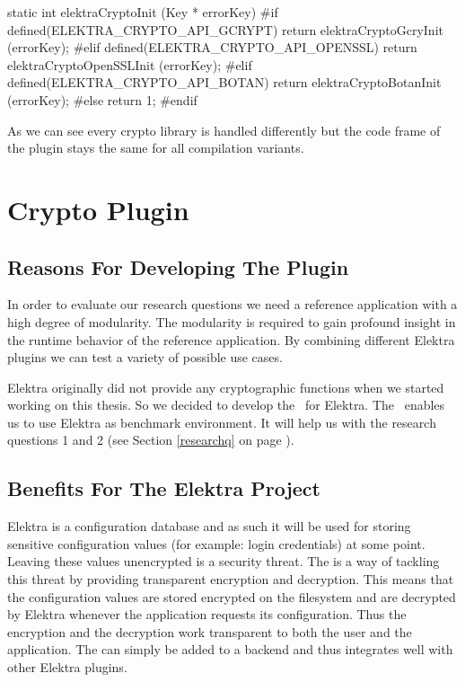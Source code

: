 \begin{code}[label=impl-cryptoInit,language=C,caption={Example of how to use compilation variants in Elektra}]
static int elektraCryptoInit (Key * errorKey)
{
#if defined(ELEKTRA_CRYPTO_API_GCRYPT)
	return elektraCryptoGcryInit (errorKey);
#elif defined(ELEKTRA_CRYPTO_API_OPENSSL)
	return elektraCryptoOpenSSLInit (errorKey);
#elif defined(ELEKTRA_CRYPTO_API_BOTAN)
	return elektraCryptoBotanInit (errorKey);
#else
	return 1;
#endif
}
\end{code}

As we can see every crypto library is handled differently but the code frame of the plugin stays the same for all compilation variants.

\section{Crypto Plugin}\label{crypto-plugin}

\subsection{Reasons For Developing The Plugin}

In order to evaluate our research questions we need a reference application with a high degree of modularity.
The modularity is required to gain profound insight in the runtime behavior of the reference application.
By combining different Elektra plugins we can test a variety of possible use cases.

Elektra originally did not provide any cryptographic functions when we started working on this thesis.
So we decided to develop the \crypto ~for Elektra.
The \crypto ~enables us to use Elektra as benchmark environment.
It will help us with the research questions 1 and 2 (see Section \ref{researchq} on page \pageref{researchq}).

\subsection{Benefits For The Elektra Project}

Elektra is a configuration database and as such it will be used for storing sensitive configuration values (for example: login credentials) at some point.
Leaving these values unencrypted is a security threat.
The \crypto{} is a way of tackling this threat by providing transparent encryption and decryption.
This means that the configuration values are stored encrypted on the filesystem and are decrypted by Elektra whenever the application requests its configuration.
Thus the encryption and the decryption work transparent to both the user and the application.
The \crypto{} can simply be added to a backend and thus integrates well with other Elektra plugins.

